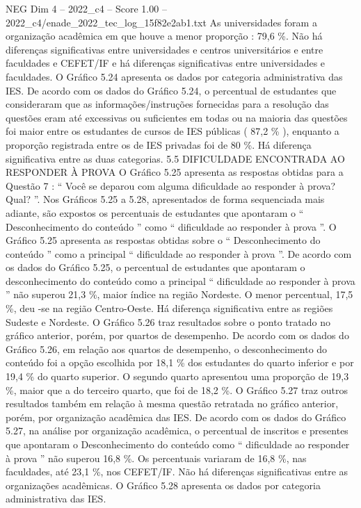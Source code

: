 \begin{textsample}{NEG Dim 4 – 2022\_c4 – Score 1.00 – 2022\_c4/enade\_2022\_tec\_log\_15f82e2ab1.txt}
As universidades foram a organização acadêmica em que houve a menor proporção : 79,6 \%.
Não há diferenças significativas entre universidades e centros universitários e entre faculdades e CEFET/IF e há diferenças significativas entre universidades e faculdades.
O Gráfico 5.24 apresenta os dados por categoria administrativa das IES.
De acordo com os dados do Gráfico 5.24, o percentual de estudantes que consideraram que as informações/instruções fornecidas para a resolução das questões eram até excessivas ou suficientes em todas ou na maioria das questões foi maior entre os estudantes de cursos de IES públicas ( 87,2 \% ), enquanto a proporção registrada entre os de IES privadas foi de 80 \%.
Há diferença significativa entre as duas categorias. 5.5 DIFICULDADE ENCONTRADA AO RESPONDER À PROVA O Gráfico 5.25 apresenta as respostas obtidas para a Questão 7 : “ Você se deparou com alguma dificuldade ao responder à prova?
Qual? ”.
Nos Gráficos 5.25 a 5.28, apresentados de forma sequenciada mais adiante, são expostos os percentuais de estudantes que apontaram o “ Desconhecimento do conteúdo ” como “ dificuldade ao responder à prova ”.
O Gráfico 5.25 apresenta as respostas obtidas sobre o “ Desconhecimento do conteúdo ” como a principal “ dificuldade ao responder à prova ”.
De acordo com os dados do Gráfico 5.25, o percentual de estudantes que apontaram o desconhecimento do conteúdo como a principal “ dificuldade ao responder à prova ” não superou 21,3 \%, maior índice na região Nordeste.
O menor percentual, 17,5 \%, deu -se na região Centro-Oeste.
Há diferença significativa entre as regiões Sudeste e Nordeste.
O Gráfico 5.26 traz resultados sobre o ponto tratado no gráfico anterior, porém, por quartos de desempenho.
De acordo com os dados do Gráfico 5.26, em relação aos quartos de desempenho, o desconhecimento do conteúdo foi a opção escolhida por 18,1 \% dos estudantes do quarto inferior e por 19,4 \% do quarto superior.
O segundo quarto apresentou uma proporção de 19,3 \%, maior que a do terceiro quarto, que foi de 18,2 \%.
O Gráfico 5.27 traz outros resultados também em relação à mesma questão retratada no gráfico anterior, porém, por organização acadêmica das IES.
De acordo com os dados do Gráfico 5.27, na análise por organização acadêmica, o percentual de inscritos e presentes que apontaram o Desconhecimento do conteúdo como “ dificuldade ao responder à prova ” não superou 16,8 \%.
Os percentuais variaram de 16,8 \%, nas faculdades, até 23,1 \%, nos CEFET/IF.
Não há diferenças significativas entre as organizações acadêmicas.
O Gráfico 5.28 apresenta os dados por categoria administrativa das IES.

\end{textsample}
